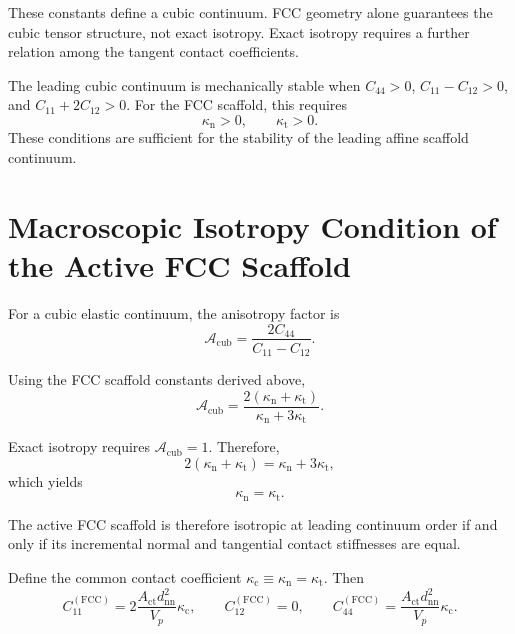 These constants define a cubic continuum. FCC geometry alone guarantees the cubic tensor structure, not exact isotropy. Exact isotropy requires a further relation among the tangent contact coefficients.

The leading cubic continuum is mechanically stable when $C_{44}>0$, $C_{11}-C_{12}>0$, and $C_{11}+2C_{12}>0$. For the FCC scaffold, this requires
\begin{equation}
    \kappa_{\mathrm{n}}>0, \qquad \kappa_{\mathrm{t}}>0.
\end{equation}
These conditions are sufficient for the stability of the leading affine scaffold continuum.

\section{Macroscopic Isotropy Condition of the Active FCC Scaffold}

For a cubic elastic continuum, the anisotropy factor is
\begin{equation}
    \mathcal{A}_{\mathrm{cub}} = \frac{2C_{44}}{C_{11}-C_{12}}.
\end{equation}

Using the FCC scaffold constants derived above,
\begin{equation}
    \mathcal{A}_{\mathrm{cub}} = \frac{ 2(\kappa_{\mathrm{n}}+\kappa_{\mathrm{t}}) }{ \kappa_{\mathrm{n}}+3\kappa_{\mathrm{t}} }.
\end{equation}

Exact isotropy requires $\mathcal{A}_{\mathrm{cub}}=1$. Therefore,
\begin{equation}
    2(\kappa_{\mathrm{n}}+\kappa_{\mathrm{t}}) = \kappa_{\mathrm{n}}+3\kappa_{\mathrm{t}},
\end{equation}
which yields
\begin{equation}
    \boxed{ \kappa_{\mathrm{n}} = \kappa_{\mathrm{t}} }.
\end{equation}

The active FCC scaffold is therefore isotropic at leading continuum order if and only if its incremental normal and tangential contact stiffnesses are equal.

Define the common contact coefficient $\kappa_{\mathrm{c}} \equiv \kappa_{\mathrm{n}} = \kappa_{\mathrm{t}}$. Then
\begin{equation}
    C_{11}^{(\mathrm{FCC})} = 2 \frac{A_{\mathrm{ct}}d_{\mathrm{nn}}^2}{V_p} \kappa_{\mathrm{c}}, \qquad C_{12}^{(\mathrm{FCC})}=0, \qquad C_{44}^{(\mathrm{FCC})} = \frac{A_{\mathrm{ct}}d_{\mathrm{nn}}^2}{V_p} \kappa_{\mathrm{c}}.
\end{equation}

